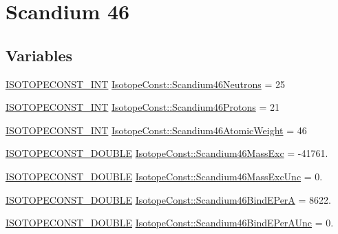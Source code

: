 \hypertarget{group___isotope_const-_scandium-_sc46}{}\section{Scandium 46}
\label{group___isotope_const-_scandium-_sc46}
\subsection*{Variables}
\begin{DoxyCompactItemize}
\item 
\mbox{\hyperlink{group___isotope_const-_macros_ga5f18360b3e99483a35c32d789e62621c}{I\+S\+O\+T\+O\+P\+E\+C\+O\+N\+S\+T\+\_\+\+I\+NT}} \mbox{\hyperlink{group___isotope_const-_scandium-_sc46_ga735c5db2870398b9b21e16f43606045d}{Isotope\+Const\+::\+Scandium46\+Neutrons}} = 25
\item 
\mbox{\hyperlink{group___isotope_const-_macros_ga5f18360b3e99483a35c32d789e62621c}{I\+S\+O\+T\+O\+P\+E\+C\+O\+N\+S\+T\+\_\+\+I\+NT}} \mbox{\hyperlink{group___isotope_const-_scandium-_sc46_ga2f90bd7495f7b4bae85d42505445a7b9}{Isotope\+Const\+::\+Scandium46\+Protons}} = 21
\item 
\mbox{\hyperlink{group___isotope_const-_macros_ga5f18360b3e99483a35c32d789e62621c}{I\+S\+O\+T\+O\+P\+E\+C\+O\+N\+S\+T\+\_\+\+I\+NT}} \mbox{\hyperlink{group___isotope_const-_scandium-_sc46_ga61dd4f0a4a85cc45bbbdcb1a48b4b4ad}{Isotope\+Const\+::\+Scandium46\+Atomic\+Weight}} = 46
\item 
\mbox{\hyperlink{group___isotope_const-_macros_ga8f45a7272ce02c0b4c65c44636ed719a}{I\+S\+O\+T\+O\+P\+E\+C\+O\+N\+S\+T\+\_\+\+D\+O\+U\+B\+LE}} \mbox{\hyperlink{group___isotope_const-_scandium-_sc46_ga2ed2513a3a414a46d63bfef79d3691fa}{Isotope\+Const\+::\+Scandium46\+Mass\+Exc}} = -\/41761.
\item 
\mbox{\hyperlink{group___isotope_const-_macros_ga8f45a7272ce02c0b4c65c44636ed719a}{I\+S\+O\+T\+O\+P\+E\+C\+O\+N\+S\+T\+\_\+\+D\+O\+U\+B\+LE}} \mbox{\hyperlink{group___isotope_const-_scandium-_sc46_ga652901eb04b2e7c85ebbae5cb6789017}{Isotope\+Const\+::\+Scandium46\+Mass\+Exc\+Unc}} = 0.
\item 
\mbox{\hyperlink{group___isotope_const-_macros_ga8f45a7272ce02c0b4c65c44636ed719a}{I\+S\+O\+T\+O\+P\+E\+C\+O\+N\+S\+T\+\_\+\+D\+O\+U\+B\+LE}} \mbox{\hyperlink{group___isotope_const-_scandium-_sc46_gac576c73972098c4103d93b0598c827c6}{Isotope\+Const\+::\+Scandium46\+Bind\+E\+PerA}} = 8622.
\item 
\mbox{\hyperlink{group___isotope_const-_macros_ga8f45a7272ce02c0b4c65c44636ed719a}{I\+S\+O\+T\+O\+P\+E\+C\+O\+N\+S\+T\+\_\+\+D\+O\+U\+B\+LE}} \mbox{\hyperlink{group___isotope_const-_scandium-_sc46_ga414180c3e41334324b9815ca166dc636}{Isotope\+Const\+::\+Scandium46\+Bind\+E\+Per\+A\+Unc}} = 0.

\end{DoxyCompactItemize}
